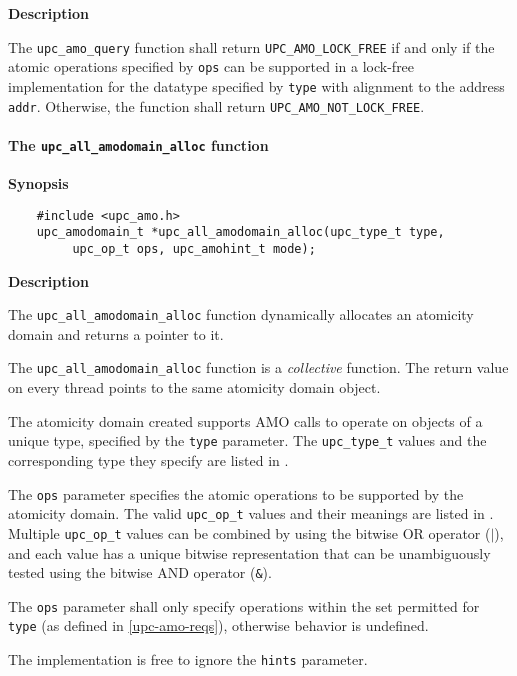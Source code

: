 {\bf Description}

\np The {\tt upc\_amo\_query} function shall return {\tt UPC\_AMO\_LOCK\_FREE}
    if and only if the atomic operations specified by {\tt ops} can be
    supported in a lock-free implementation for the datatype specified by
    {\tt type} with alignment to the address {\tt addr}.  Otherwise, the
    function shall return {\tt UPC\_AMO\_NOT\_LOCK\_FREE}.

\paragraph{The {\tt upc\_all\_amodomain\_alloc} function}

{\bf Synopsis}

\npf\vspace{-1.8em}
\begin{verbatim}
    #include <upc_amo.h>
    upc_amodomain_t *upc_all_amodomain_alloc(upc_type_t type,
         upc_op_t ops, upc_amohint_t mode);
\end{verbatim}

{\bf Description}

\np The {\tt upc\_all\_amodomain\_alloc} function dynamically allocates an
    atomicity domain and returns a pointer to it.

\np The {\tt upc\_all\_amodomain\_alloc} function is a {\em collective} function.
    The return value on every thread points to the same atomicity domain
    object.

\np The atomicity domain created supports AMO calls to operate on objects of a
    unique type, specified by the {\tt type} parameter.  The {\tt upc\_type\_t}
    values and the corresponding type they specify are listed in
    \upctypesection{}.

\np The {\tt ops} parameter specifies the atomic operations to be supported by
    the atomicity domain.  The valid {\tt upc\_op\_t} values and their meanings
    are listed in \upcopsection{}.  Multiple {\tt upc\_op\_t} values
    can be combined by using the bitwise OR operator ($|$), and each value has
    a unique bitwise representation that can be unambiguously tested using the
    bitwise AND operator ({\tt \&}).

\np The {\tt ops} parameter shall only specify operations within the set
    permitted for {\tt type} (as defined in \ref{upc-amo-reqs}), otherwise
    behavior is undefined.

\np The implementation is free to ignore the {\tt hints} parameter.

